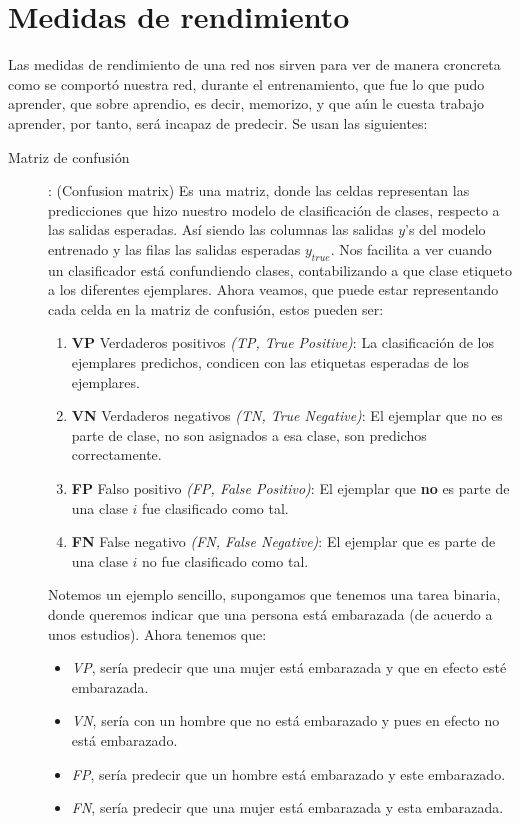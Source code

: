 \section{Medidas de rendimiento}

Las medidas de rendimiento de una red nos sirven para ver de manera croncreta como se comportó nuestra red, durante el entrenamiento, que fue lo que pudo aprender, que sobre aprendio, es decir, memorizo, y que aún le cuesta trabajo aprender, por tanto, será incapaz de predecir. Se usan las siguientes:

\begin{description}
 \item [Matriz de confusión]: (Confusion matrix)
 Es una matriz, donde las celdas representan las predicciones que hizo nuestro modelo de clasificación de clases, respecto a las salidas esperadas. Así siendo las columnas las salidas $y$'s del modelo entrenado y las filas las salidas esperadas $y_{true}$. 
 Nos facilita a ver cuando un clasificador está confundiendo clases, contabilizando a que clase etiqueto a los diferentes ejemplares. Ahora veamos, que puede estar representando cada celda en la matriz de confusión, estos pueden ser:
 \begin{enumerate}
  \item \textbf{VP} Verdaderos positivos \emph{(TP, True Positive)}: La clasificación de los ejemplares predichos, condicen con las etiquetas esperadas de los ejemplares. 
  
  \item \textbf{VN} Verdaderos negativos \emph{(TN, True Negative)}: El ejemplar que no es parte de clase, no son asignados a esa clase, son predichos correctamente.
  
  \item \textbf{FP} Falso positivo \emph{(FP, False Positivo)}: El ejemplar que \textbf{no} es parte de una clase $i$ fue clasificado como tal.
  
  \item \textbf{FN} False negativo  \emph{(FN, False Negative)}: El ejemplar que es parte de una clase $i$ no fue clasificado como tal. 
 \end{enumerate}

  \begin{example}
   Notemos un ejemplo sencillo, supongamos que tenemos una tarea binaria, donde queremos indicar que una persona está
   embarazada (de acuerdo a unos estudios). Ahora tenemos que:
   

   \begin{itemize}
    \item \emph{VP}, sería predecir que una mujer está embarazada y que en efecto esté embarazada. 
    \item \emph{VN}, sería con un hombre que no está embarazado y pues en efecto no está embarazado.  
    \item \emph{FP}, sería predecir que un hombre está embarazado y  este embarazado.  
    \item \emph{FN}, sería predecir que una mujer  está embarazada y esta embarazada. 
   \end{itemize}



\end{example}
\end{description}
